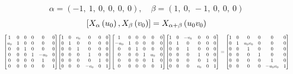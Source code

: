\documentclass[11pt]{article}
\theoremstyle{definition}
\begin{document}
\[
\alpha = \left( -1, \  1, \  0, \  0, \  0, \  0\right), \quad \beta = \left( 1, \  0, \  -1, \  0, \  0, \  0\right)
\]
\[
\scaletoalign{\textwidth}{\left[ X_{\alpha}\left(u_{0}\right), X_{\beta}\left(v_{0}\right) \right] = X_{\alpha + \beta}\left(u_{0} v_{0}\right)}
\]
\[
\scaletoalign{\textwidth}{{\left[\begin{matrix}1 & 0 & 0 & 0 & 0 & 0\\u_{0} & 1 & 0 & 0 & 0 & 0\\0 & 0 & 1 & 0 & 0 & 0\\0 & 0 & 0 & 1 & - u_{0} & 0\\0 & 0 & 0 & 0 & 1 & 0\\0 & 0 & 0 & 0 & 0 & 1\end{matrix}\right]} {\left[\begin{matrix}1 & 0 & v_{0} & 0 & 0 & 0\\0 & 1 & 0 & 0 & 0 & 0\\0 & 0 & 1 & 0 & 0 & 0\\0 & 0 & 0 & 1 & 0 & 0\\0 & 0 & 0 & 0 & 1 & 0\\0 & 0 & 0 & - v_{0} & 0 & 1\end{matrix}\right]} {\left[\begin{matrix}1 & 0 & 0 & 0 & 0 & 0\\- u_{0} & 1 & 0 & 0 & 0 & 0\\0 & 0 & 1 & 0 & 0 & 0\\0 & 0 & 0 & 1 & u_{0} & 0\\0 & 0 & 0 & 0 & 1 & 0\\0 & 0 & 0 & 0 & 0 & 1\end{matrix}\right]} {\left[\begin{matrix}1 & 0 & - v_{0} & 0 & 0 & 0\\0 & 1 & 0 & 0 & 0 & 0\\0 & 0 & 1 & 0 & 0 & 0\\0 & 0 & 0 & 1 & 0 & 0\\0 & 0 & 0 & 0 & 1 & 0\\0 & 0 & 0 & v_{0} & 0 & 1\end{matrix}\right]} = {\left[\begin{matrix}1 & 0 & 0 & 0 & 0 & 0\\0 & 1 & u_{0} v_{0} & 0 & 0 & 0\\0 & 0 & 1 & 0 & 0 & 0\\0 & 0 & 0 & 1 & 0 & 0\\0 & 0 & 0 & 0 & 1 & 0\\0 & 0 & 0 & 0 & - u_{0} v_{0} & 1\end{matrix}\right]}}
\]
\end{document}
